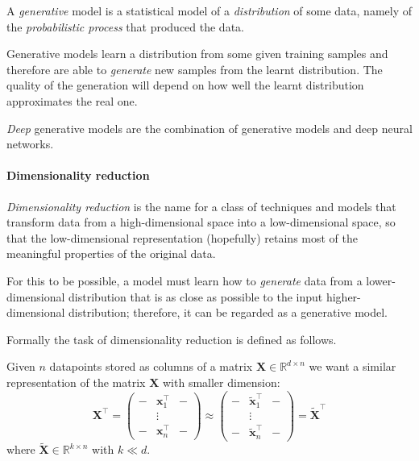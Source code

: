 
A \emph{generative} model is a statistical model of a \emph{distribution} of some data, namely of the \emph{probabilistic process} that produced the data. 

Generative models learn a distribution from some given training samples and therefore are able to \emph{generate} new samples from the learnt distribution. The quality of the generation will depend on how well the learnt distribution approximates the real one.

\emph{Deep} generative models are the combination of generative models and deep neural networks.

\paragraph{Dimensionality reduction}

\emph{Dimensionality reduction} is the name for a class of techniques and models that transform data from a high-dimensional space into a low-dimensional space, so that the low-dimensional representation (hopefully) retains most of the meaningful properties of the original data.

For this to be possible, a model must learn how to \emph{generate} data from a lower-dimensional distribution that is as close as possible to the input higher-dimensional distribution; therefore, it can be regarded as a generative model.

Formally the task of dimensionality reduction is defined as follows.

Given $n$ datapoints stored as columns of a matrix $\mathbf{X} \in \mathbb{R}^{d \times n}$ we want a similar representation of the matrix $\mathbf{X}$ with smaller dimension:
\begin{equation}
	\mathbf{X}^\top = \left( \begin{smallmatrix}-&\mathbf{x}_1^\top&-  \\ & \vdots & \\ -&\mathbf{x}_n^\top &-\end{smallmatrix} \right) \approx \left( \begin{smallmatrix}-&\tilde{\mathbf{x}}_1^\top&-  \\ & \vdots & \\ -&\tilde{\mathbf{x}}_n^\top &-\end{smallmatrix} \right) = \tilde{\mathbf{X}}^\top
\end{equation}
where $\tilde{\mathbf{X}}\in \mathbb{R}^{k \times n}$ with $k \ll d$.

